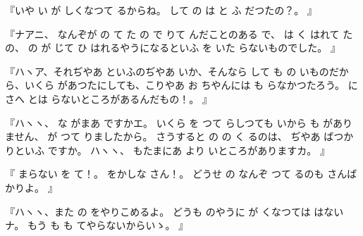 
『いや
い
が
しくなつて
るからね。
して
の
は
と
ふ
だつたの？。
』

『ナアニ、
なんぞが
の
て
た
の
で
りて
んだことのある
で、
は
く
はれて
た
の、
の
が
じて
ひ
はれるやうになるといふ
を
いた
らないものでした。
』

『ハヽア、それぢやあ
といふのぢやあ
いか、そんなら
して
も
の
いものだから、いくら
があつたにしても、こりやあ
お
ちやんには
も
らなかつたろう。
にさへ
とは
らないところがあるんだもの！。
』

『ハヽヽ、
な
がまあ
ですかエ。
いくら
を
つて
らしつても
いから
も
がありません、
が
つて
りましたから。
さうすると
の
の
く
るのは、
ぢやあ
ばつかりといふ
ですか。
ハヽヽ、
もたまにあ
より
いところがありますカ。
』

『
まらない
を
て！。
をかしな
さん！。
どうせ
の
なんぞ
つて
るのも
さんばかりよ。
』

『ハヽヽ、また
の
をやりこめるよ。
どうも
のやうに
が
くなつては
はないナ。
もう
も
も
てやらないからいゝ。
』

